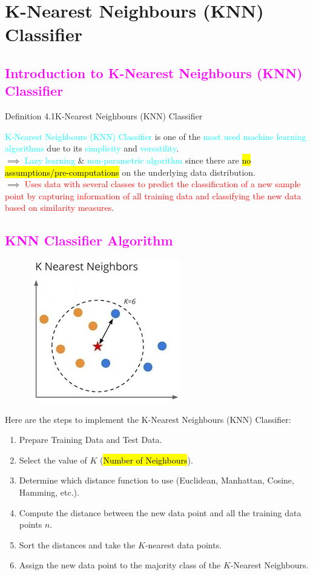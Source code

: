 \documentclass{book}
\begin{document}
\chapter{K-Nearest Neighbours (KNN) Classifier}
\textcolor{magenta}{\section{\textbf{Introduction to K-Nearest Neighbours (KNN) Classifier}}}
\begin{defBox}{Definition 4.1}{K-Nearest Neighbours (KNN) Classifier}
    \raggedright
    \textcolor{cyan}{K-Nearest Neighbours (KNN) Classifier} is one of the \textcolor{cyan}{most used machine learning algorithms} due to its \textcolor{cyan}{simplicity} and \textcolor{cyan}{versatility}.\\
    $\implies$ \textcolor{cyan}{Lazy learning} \& \textcolor{cyan}{non-parametric algorithm} since there are \hl{no assumptions/pre-computations} on the underlying data distribution.\\
    $\implies$ \textcolor{red}{Uses data with several classes to predict the classification of a new sample point by capturing information of all training data and classifying the new data based on similarity measures}.
\end{defBox}
\textcolor{magenta}{\section{\textbf{KNN Classifier Algorithm}}}
\begin{figure}
    \centering
    \includegraphics[scale=0.45]{chapter 4/ch4_figure1.jpeg}
\end{figure}
Here are the steps to implement the K-Nearest Neighbours (KNN) Classifier:\\
\vspace{2mm}
\begin{enumerate}
    \item Prepare Training Data and Test Data.
    \item Select the value of \(K\) (\hl{Number of Neighbours}).
    \item Determine which distance function to use (Euclidean, Manhattan, Cosine, Hamming, etc.).
    \item Compute the distance between the new data point and all the training data points \(n\).
    \item Sort the distances and take the \(K\)-nearest data points.
    \item Assign the new data point to the majority class of the \(K\)-Nearest Neighbours.
\end{enumerate}
\end{document}
